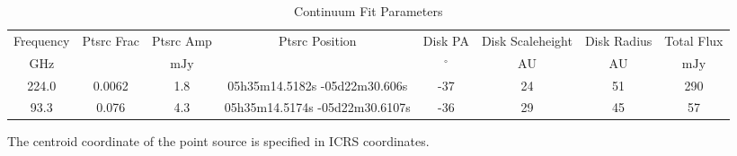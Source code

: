 \begin{table*}[htp]
\centering
\caption{Continuum Fit Parameters}
\begin{tabular}{cccccccc}
\label{tab:continuum_fit_parameters}
Frequency & Ptsrc Frac & Ptsrc Amp & Ptsrc Position & Disk PA & Disk Scaleheight & Disk Radius & Total Flux \\
$\mathrm{GHz}$ & $\mathrm{}$ & $\mathrm{mJy}$ &  & $\mathrm{{}^{\circ}}$ & $\mathrm{AU}$ & $\mathrm{AU}$ & $\mathrm{mJy}$ \\
\hline
224.0 & 0.0062 & 1.8 & 05h35m14.5182s -05d22m30.606s & -37 & 24 & 51 & 290 \\
93.3 & 0.076 & 4.3 & 05h35m14.5174s -05d22m30.6107s & -36 & 29 & 45 & 57 \\
\hline
\end{tabular}

\par The centroid coordinate of the point source is specified in ICRS coordinates.
\end{table*}

